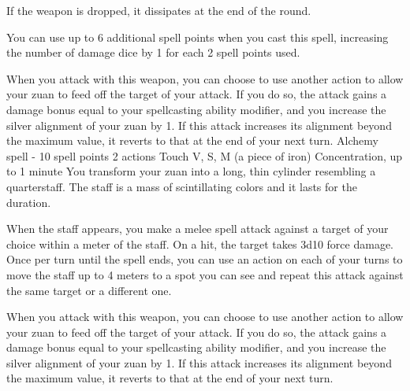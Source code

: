         If the weapon is dropped, it dissipates at the end of the round.

        You can use up to 6 additional spell points when you cast this spell, increasing the number of damage dice by 1 for each 2 spell points used.

        When you attack with this weapon, you can choose to use another action to allow your zuan to feed off the target of your attack.
        If you do so, the attack gains a damage bonus equal to your spellcasting ability modifier, and you increase the silver alignment of your zuan by 1.
        If this attack increases its alignment beyond the maximum value, it reverts to that at the end of your next turn.
        {Alchemy spell - 10 spell points}
        {2 actions}
        {Touch}
        {V, S, M (a piece of iron)}
        {Concentration, up to 1 minute}
        You transform your zuan into a long, thin cylinder resembling a quarterstaff.
        The staff is a mass of scintillating colors and it lasts for the duration.

        When the staff appears, you make a melee spell attack against a target of your choice within a meter of the staff.
        On a hit, the target takes 3d10 force damage.
        Once per turn until the spell ends, you can use an action on each of your turns to move the staff up to 4 meters to a spot you can see and repeat this attack against the same target or a different one.

        When you attack with this weapon, you can choose to use another action to allow your zuan to feed off the target of your attack.
        If you do so, the attack gains a damage bonus equal to your spellcasting ability modifier, and you increase the silver alignment of your zuan by 1.
        If this attack increases its alignment beyond the maximum value, it reverts to that at the end of your next turn.
